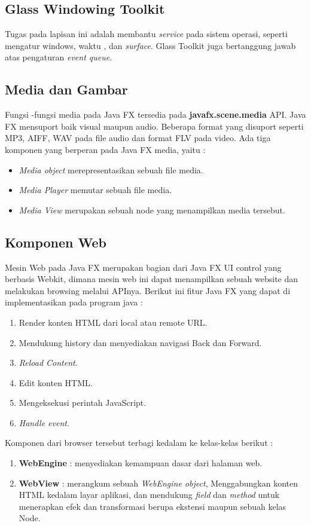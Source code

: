 \subsection{Glass Windowing Toolkit}
Tugas pada lapisan ini adalah membantu \textit{service} pada sistem operasi, seperti mengatur windows, waktu , dan \textit{surface}. Glass Toolkit juga bertanggung jawab atas pengaturan \textit{event queue}.\cite{javafx}

\subsection{Media dan Gambar}
Fungsi -fungsi media pada Java FX tersedia pada \textbf{javafx.scene.media} API. Java FX mensuport baik visual maupun audio. Beberapa format yang disuport seperti MP3, AIFF, WAV pada file audio dan format FLV pada video. Ada tiga komponen yang berperan pada Java FX media, yaitu :\cite{javafx} 
\begin{itemize}
	\item \textit{Media object} merepresentasikan sebuah file media.
	\item \textit{Media Player} memutar sebuah file media.
	\item \textit{Media View} merupakan sebuah node yang menampilkan media tersebut.
\end{itemize}

\subsection{Komponen Web}
Mesin Web pada Java FX merupakan bagian dari Java FX UI control yang berbasis Webkit, dimana mesin web ini dapat menampilkan sebuah website dan melakukan browsing melalui APInya. Berikut ini fitur Java FX yang dapat di implementasikan pada program java :\cite{javafx}
\begin{enumerate}
	\item Render konten HTML dari local atau remote URL.
	\item Mendukung history dan menyediakan navigasi Back dan Forward.
	\item \textit{Reload Content}.
	\item Edit konten HTML.
	\item Mengeksekusi perintah JavaScript.
	\item \textit{Handle event}.
\end{enumerate} 

Komponen dari browser tersebut terbagi kedalam ke kelas-kelas berikut :\cite{javafx}
\begin{enumerate}
	\item \textbf{WebEngine} : menyediakan kemampuan dasar dari halaman web.
	\item \textbf{WebView} : merangkum sebuah \textit{WebEngine object}, Menggabungkan konten HTML kedalam layar aplikasi, dan mendukung \textit{field} dan \textit{method} untuk menerapkan efek dan transformasi berupa ekstensi maupun sebuah kelas Node.
\end{enumerate}

